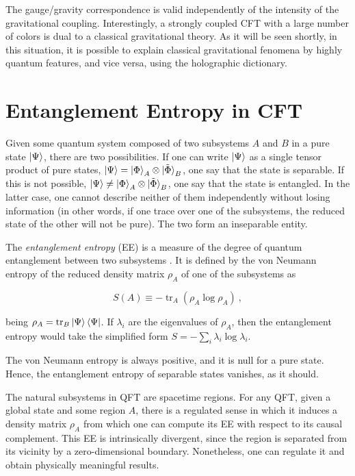\documentclass[twocolumn]{revtex4}
\providecommand{\eq}[2]{
    \begin{equation}
        #2
    \label{eq:#1}
    \end{equation}
}
\DeclareMathOperator{\tr}{tr}
\begin{document}
The gauge/gravity correspondence is valid independently of the intensity of the gravitational coupling. Interestingly, a strongly coupled CFT with a large number of colors is dual to a classical gravitational theory. As it will be seen shortly, in this situation, it is possible to explain classical gravitational fenomena by highly quantum features, and vice versa, using the holographic dictionary.


\section{Entanglement Entropy in CFT} \label{s:EE_CFT}

Given some quantum system composed of two subsystems $A$ and $B$ in a pure state $\ket{\Psi}$, there are two possibilities. If one can write $\ket{\Psi}$ as a single tensor product of pure states, $\ket{\Psi} = \ket{\Phi}_A \otimes \ket{\tilde{\Phi}}_B$, one say that the state is separable. If this is not possible, $\ket{\Psi} \neq \ket{\Phi}_A \otimes \ket{\tilde{\Phi}}_B$, one say that the state is entangled.
In the latter case, one cannot describe neither of them independently without losing information (in other words, if one trace over one of the subsystems, the reduced state of the other will not be pure). The two form an inseparable entity.

The \emph{entanglement entropy} (EE) is a measure of the degree of quantum entanglement between two subsystems \cite{nishioka_entanglement_2018}. It is defined by the von Neumann entropy of the reduced density matrix $\rho_A$ of one of the subsystems as
\eq{EE}{
    S(A) \equiv - \tr_A ( \rho_A \log \rho_A ) \ ,
}
being $\rho_A = \tr_B \ket{\Psi}\bra{\Psi}$. If $\lambda_i$ are the eigenvalues of $\rho_A$, then the entanglement entropy would take the simplified form $S = - \sum_i \lambda_i \log \lambda_i$.

The von Neumann entropy is always positive, and it is null for a pure state. Hence, the entanglement entropy of separable states vanishes, as it should. 


The natural subsystems in QFT are spacetime regions. For any QFT, given a global state and some region $A$, there is a regulated sense in which it induces a density matrix $\rho_A$ from which one can compute its EE with respect to its causal complement.
This EE is intrinsically divergent, since the region is separated from its vicinity by a zero-dimensional boundary. Nonetheless, one can regulate it and obtain physically meaningful results.
\end{document}

